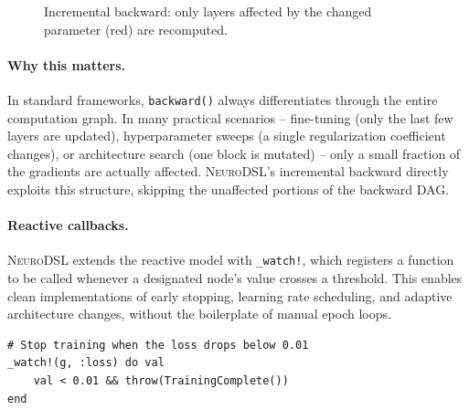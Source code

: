 \documentclass{article}
\begin{document}
\begin{figure}[H]
\centering
{}
\caption{Incremental backward: only layers affected by the changed parameter (red) are recomputed.}
\label{fig:incremental}
\end{figure}

\paragraph{Why this matters.} In standard frameworks, \texttt{backward()} always differentiates through the entire computation graph. In many practical scenarios -- fine-tuning (only the last few layers are updated), hyperparameter sweeps (a single regularization coefficient changes), or architecture search (one block is mutated) -- only a small fraction of the gradients are actually affected. \textsc{NeuroDSL}'s incremental backward directly exploits this structure, skipping the unaffected portions of the backward DAG.

\paragraph{Reactive callbacks.} \textsc{NeuroDSL} extends the reactive model with \texttt{\_watch!}, which registers a function to be called whenever a designated node's value crosses a threshold. This enables clean implementations of early stopping, learning rate scheduling, and adaptive architecture changes, without the boilerplate of manual epoch loops.

\begin{lstlisting}[caption={Reactive early stopping via \_watch!}, label={lst:watch}]
# Stop training when the loss drops below 0.01
_watch!(g, :loss) do val
    val < 0.01 && throw(TrainingComplete())
end
\end{lstlisting}
\end{document}
